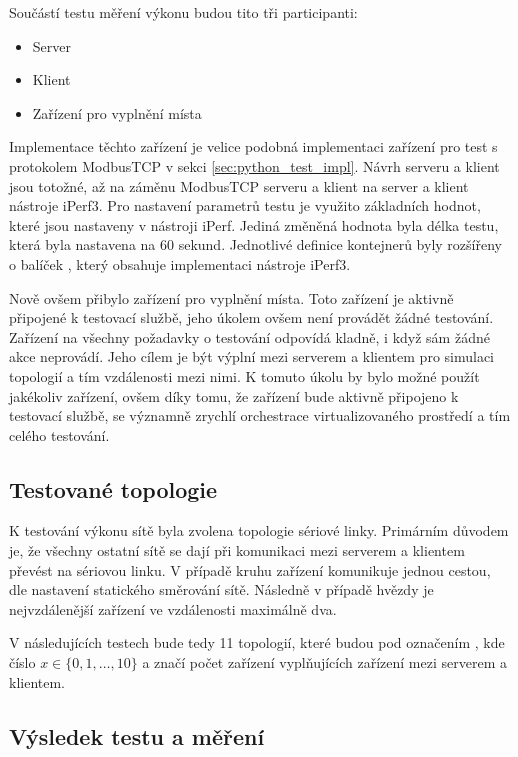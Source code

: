 Součástí testu měření výkonu budou tito tři participanti:

\begin{itemize}
    \item Server
    \item Klient
    \item Zařízení pro vyplnění místa
\end{itemize}

Implementace těchto zařízení je velice podobná implementaci zařízení pro test s protokolem ModbusTCP v sekci \ref{sec:python_test_impl}. Návrh serveru a klient jsou totožné, až na záměnu ModbusTCP serveru a klient na server a klient nástroje iPerf3. Pro nastavení parametrů testu je využito základních hodnot, které jsou nastaveny v nástroji iPerf. Jediná změněná hodnota byla délka testu, která byla nastavena na 60 sekund. Jednotlivé definice kontejnerů byly rozšířeny o balíček , který obsahuje implementaci nástroje iPerf3. 

Nově ovšem přibylo zařízení pro vyplnění místa. Toto zařízení je aktivně připojené k testovací službě, jeho úkolem ovšem není provádět žádné testování. Zařízení na všechny požadavky o testování odpovídá kladně, i když sám žádné akce neprovádí. Jeho cílem je být výplní mezi serverem a klientem pro simulaci topologií a tím vzdálenosti mezi nimi. K tomuto úkolu by bylo možné použít jakékoliv zařízení, ovšem díky tomu, že zařízení bude aktivně připojeno k testovací službě, se významně zrychlí orchestrace virtualizovaného prostředí a tím celého testování.


\subsection{Testované topologie}

K testování výkonu sítě byla zvolena topologie sériové linky. Primárním důvodem je, že všechny ostatní sítě se dají při komunikaci mezi serverem a klientem převést na sériovou linku. V případě kruhu zařízení komunikuje jednou cestou, dle nastavení statického směrování sítě. Následně v případě hvězdy je nejvzdálenější zařízení ve vzdálenosti maximálně dva. 

V následujících testech bude tedy 11 topologií, které budou pod označením , kde číslo $x \in \{0,1,\dots, 10\}$ a značí počet zařízení vyplňujících zařízení mezi serverem a klientem.

\subsection{Výsledek testu a měření}

